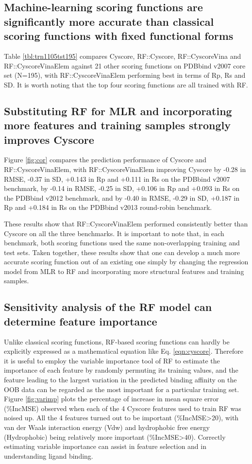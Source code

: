 \documentclass[linenumbers]{bmcart}
\begin{document}
\subsection*{Machine-learning scoring functions are significantly more accurate than classical scoring functions with fixed functional forms}

Table \ref{tbl:trn1105tst195} compares Cyscore, RF::Cyscore, RF::CyscoreVina and RF::CyscoreVinaElem against 21 other scoring functions on PDBbind v2007 core set (N=195), with RF::CyscoreVinaElem performing best in terms of Rp, Rs and SD. It is worth noting that the top four scoring functions are all trained with RF.

\subsection*{Substituting RF for MLR and incorporating more features and training samples strongly improves Cyscore}

Figure \ref{fig:cor} compares the prediction performance of Cyscore and RF::CyscoreVinaElem, with RF::CyscoreVinaElem improving Cyscore by -0.28 in RMSE, -0.37 in SD, +0.143 in Rp and +0.111 in Rs on the PDBbind v2007 benchmark, by -0.14 in RMSE, -0.25 in SD, +0.106 in Rp and +0.093 in Rs on the PDBbind v2012 benchmark, and by -0.40 in RMSE, -0.29 in SD, +0.187 in Rp and +0.184 in Rs on the PDBbind v2013 round-robin benchmark.

These results show that RF::CyscoreVinaElem performed consistently better than Cyscore on all the three benchmarks. It is important to note that, in each benchmark, both scoring functions used the same non-overlapping training and test sets. Taken together, these results show that one can develop a much more accurate scoring function out of an existing one simply by changing the regression model from MLR to RF and incorporating more structural features and training samples.

\subsection*{Sensitivity analysis of the RF model can determine feature importance}

Unlike classical scoring functions, RF-based scoring functions can hardly be explicitly expressed as a mathematical equation like Eq. \ref{eqn:cyscore}. Therefore it is useful to employ the variable importance tool of RF to estimate the importance of each feature by randomly permuting its training values, and the feature leading to the largest variation in the predicted binding affinity on the OOB data can be regarded as the most important for a particular training set. Figure \ref{fig:varimp} plots the percentage of increase in mean square error (\%IncMSE) observed when each of the 4 Cyscore features used to train RF was noised up. All the 4 features turned out to be important (\%IncMSE\textgreater 20), with van der Waals interaction energy (Vdw) and hydrophobic free energy (Hydrophobic) being relatively more important (\%IncMSE\textgreater 40). Correctly estimating variable importance can assist in feature selection and in understanding ligand binding.
\end{document}
